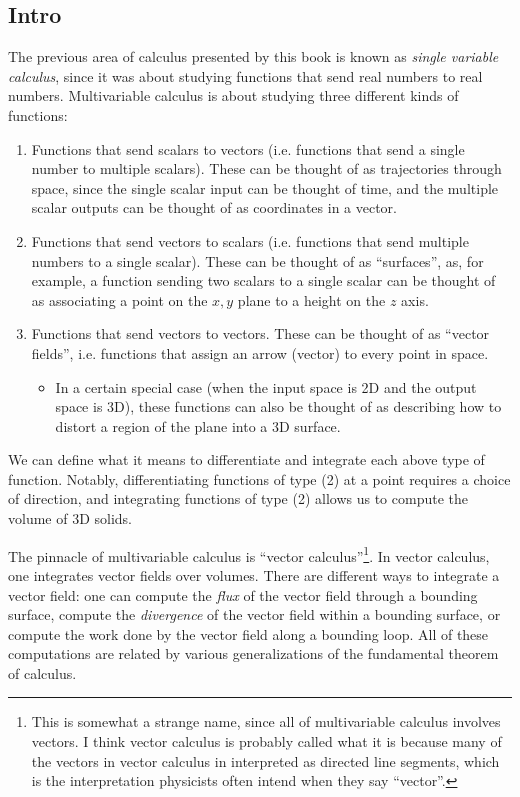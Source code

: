 \subsection*{Intro}

The previous area of calculus presented by this book is known as \textit{single variable calculus}, since it was about studying functions that send real numbers to real numbers. Multivariable calculus is about studying three different kinds of functions:

\begin{enumerate}
    \item Functions that send scalars to vectors (i.e. functions that send a single number to multiple scalars). These can be thought of as trajectories through space, since the single scalar input can be thought of time, and the multiple scalar outputs can be thought of as coordinates in a vector.
    
    \item Functions that send vectors to scalars (i.e. functions that send multiple numbers to a single scalar). These can be thought of as ``surfaces'', as, for example, a function sending two scalars to a single scalar can be thought of as associating a point on the $x, y$ plane to a height on the $z$ axis.

    \item Functions that send vectors to vectors. These can be thought of as ``vector fields'', i.e. functions that assign an arrow (vector) to every point in space.
    \begin{itemize}
        \item In a certain special case (when the input space is 2D and the output space is 3D), these functions can also be thought of as describing how to distort a region of the plane into a 3D surface.
    \end{itemize}
\end{enumerate}

We can define what it means to differentiate and integrate each above type of function. Notably, differentiating functions of type (2) at a point requires a choice of direction, and integrating functions of type (2) allows us to compute the volume of 3D solids.

The pinnacle of multivariable calculus is ``vector calculus''\footnote{This is somewhat a strange name, since all of multivariable calculus involves vectors. I think vector calculus is probably called what it is because many of the vectors in vector calculus in interpreted as directed line segments, which is the interpretation physicists often intend when they say ``vector''.}. In vector calculus, one integrates vector fields over volumes. There are different ways to integrate a vector field: one can compute the \textit{flux} of the vector field through a bounding surface, compute the \textit{divergence} of the vector field within a bounding surface, or compute the work done by the vector field along a bounding loop. All of these computations are related by various generalizations of the fundamental theorem of calculus.

